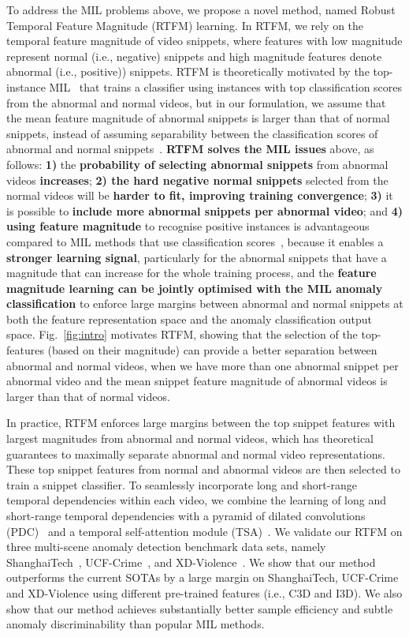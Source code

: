 \documentclass[final]{cvpr}
\begin{document}
To address the MIL problems above, we propose a novel method, named 
Robust Temporal Feature Magnitude (RTFM) learning. 
In RTFM, we rely on the temporal feature magnitude of video snippets, where features with low magnitude represent normal (i.e., negative) snippets and high magnitude features denote abnormal (i.e., positive)) snippets.
RTFM is theoretically motivated by the top- instance MIL~\cite{li2015multiple} that trains a classifier using  instances with top classification scores from the abnormal and normal videos, but in our formulation, we assume that the mean feature magnitude 
of abnormal snippets is larger than that of normal snippets, instead of assuming separability between the classification scores of abnormal and normal snippets~\cite{li2015multiple}.
\textbf{RTFM solves the MIL issues}  above, as follows: \textbf{1)} the \textbf{probability of selecting abnormal snippets} from abnormal videos \textbf{increases}; \textbf{2) the hard negative normal snippets} selected from the normal videos will be \textbf{harder to fit, improving training convergence}; \textbf{3)} it is possible to \textbf{include more abnormal snippets per abnormal video}; and
\textbf{4)} \textbf{using feature magnitude} to recognise positive instances is advantageous compared to MIL methods that use classification scores~\cite{sultani2018real,li2015multiple}, because it enables a \textbf{stronger learning signal}, particularly for the abnormal snippets that have a magnitude that can increase for the whole training process, and the \textbf{feature magnitude learning can be jointly optimised with the MIL anomaly classification} to enforce large margins between abnormal and normal snippets at both the feature representation space and the anomaly classification output space. 
Fig.~\ref{fig:intro} motivates RTFM,  showing that the selection of the top- features (based on their magnitude) can provide a better separation between abnormal and normal videos, when we have more than one abnormal snippet per abnormal video and the mean snippet feature magnitude of abnormal videos is larger than that of normal videos.


In practice, RTFM enforces large margins between the top  snippet features with largest magnitudes from abnormal and normal videos, which has theoretical guarantees to maximally separate abnormal and normal video representations.
These top  snippet features from normal and abnormal videos are then selected to train a snippet classifier. 
To seamlessly incorporate long and short-range temporal dependencies within each video, we combine the learning of long and short-range temporal dependencies with a pyramid of dilated convolutions (PDC)~\cite{yu2015multi} and a temporal self-attention module (TSA)~\cite{wang2018non}.
We validate our RTFM on three multi-scene anomaly detection benchmark data sets, namely ShanghaiTech~\cite{liu2018future}, UCF-Crime~\cite{sultani2018real}, and  XD-Violence~\cite{Wu2020not}. We show that our method outperforms the current SOTAs by a large margin on ShanghaiTech, UCF-Crime and XD-Violence using different pre-trained features (i.e., C3D and I3D). We also show that our method achieves substantially better sample efficiency and subtle anomaly discriminability than popular MIL methods.
\end{document}

